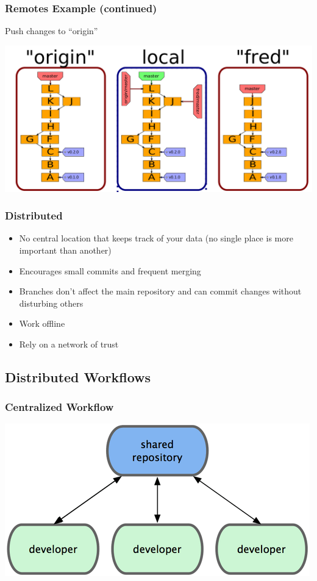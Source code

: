 \documentclass[english,compress]{beamer}
\begin{document}
\begin{frame}[fragile]
    \frametitle{Remotes Example (continued)}
	Push changes to ``origin''

	\begin{center}
		\includegraphics[width=.8\textwidth]{figs/push-fred}
	\end{center}
\end{frame}

\frame
{
    \frametitle{Distributed}
    \begin{itemize}
        \item No central location that keeps track of your data (no single place is more important than another)
        \item Encourages small commits and frequent merging
        \item Branches don't affect the main repository and can commit changes without disturbing others
        \item Work offline
        \item Rely on a network of trust
    \end{itemize}
}

\subsection{Distributed Workflows}
\frame
{
    \frametitle{Centralized Workflow}

    \begin{center}
        \includegraphics[width=.7\textwidth]{figs/centralized-workflow.png}\cite{book}
    \end{center}
}
\end{document}
